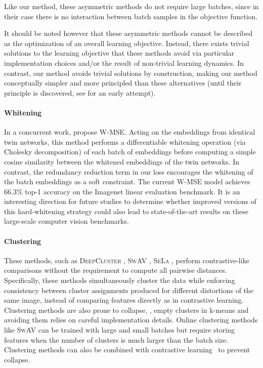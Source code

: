 Like our method, these asymmetric methods do not require large batches, since in their case there is no interaction between batch samples in the objective function.

It should be noted however that these asymmetric methods cannot be described as the optimization of an overall learning objective. Instead, there exists trivial solutions to the learning objective that these methods avoid via particular implementation choices and/or the result of non-trivial learning dynamics. In contrast, our method avoids trivial solutions by construction, making our method conceptually simpler and more principled than these alternatives (until their principle is discovered, see \cite{tian_understanding_2021} for an early attempt).

 

\paragraph{Whitening}
In a concurrent work, \cite{ermolov_whitening_2020} propose \textsc{W-MSE}. Acting on the embeddings from identical twin networks, this method performs a differentiable whitening operation (via Cholesky decomposition) of each batch of embeddings before computing a simple cosine similarity between the whitened embeddings of the twin networks. In contrast, the redundancy reduction term in our loss encourages the whitening of the batch embeddings as a soft constraint. The current W-MSE model achieves 66.3\% top-1 accuracy on the Imagenet linear evaluation benchmark. It is an interesting direction for future studies to determine whether improved versions of this hard-whitening strategy could also lead to state-of-the-art results on these large-scale computer vision benchmarks.


\paragraph{Clustering}
These methods, such as \textsc{DeepCluster} \cite{caron2018deep}, \textsc{SwAV} \cite{caron2020swav}, \textsc{SeLa} \cite{asano2019self}, perform contrastive-like comparisons without the requirement to compute all pairwise distances. Specifically, these methods simultaneously cluster the data while enforcing consistency between cluster assignments produced for different distortions of the same image, instead of comparing features directly as in contrastive learning. Clustering methods are also prone to collapse, \eg, empty clusters in k-means and avoiding them relies on careful implementation details. Online clustering methods like \textsc{SwAV} can be trained with large and small batches but require storing features when the number of clusters is much larger than the batch size. Clustering methods can also be combined with contrastive learning~\cite{li2020contrastive} to prevent collapse.


